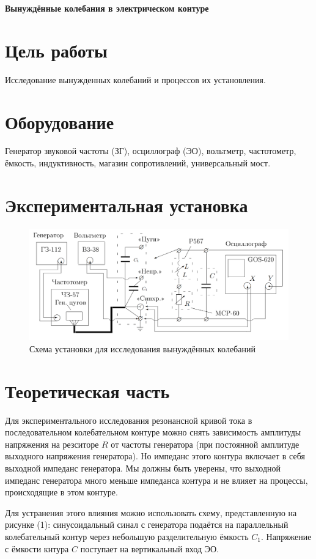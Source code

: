 \documentclass[a4paper, fontsize=14pt]{article}
\begin{document}


\huge
\centering
\textbf{Вынуждённые колебания в электрическом контуре}

\raggedright
\parindent=1cm
\large
	\section*{Цель работы}
	Исследование вынужденных колебаний и процессов их установления.
	\section*{Оборудование}
	Генератор звуковой частоты (ЗГ), осциллограф (ЭО), вольтметр, частотометр, ёмкость, индуктивность, магазин сопротивлений, универсальный мост.
	\section*{Экспериментальная установка}
	\begin{figure}[H]
		\includegraphics[width = 1.0\linewidth]{ust.png}
	\caption{Схема установки для исследования вынуждённых колебаний}
	\end{figure}
	\section*{Теоретическая часть}
	Для экспериментального исследования резонансной кривой тока в последовательном колебательном контуре можно снять зависимость амплитуды напряжения на резситоре $R$ от частоты генератора (при постоянной амплитуде выходного напряжения генератора). Но импеданс этого контура включает в себя выходной импеданс генератора. Мы должны быть уверены, что выходной импеданс генератора много меньше импеданса контура и не влияет на процессы, происходящие в этом контуре.
	
	Для устранения этого влияния можно использовать схему, представленную на рисунке (1): синусоидальный синал с генератора подаётся на параллельный колебательный контур через небольшую разделительную ёмкость $C_1$. Напряжение с ёмкости кнтура $C$ поступает на вертикальный вход ЭО.
	
\end{document}
